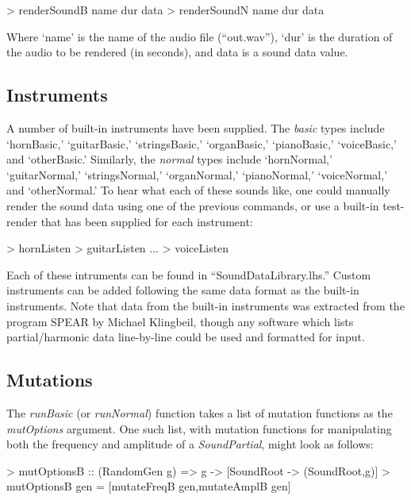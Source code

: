 \documentclass[11pt]{article}
\begin{document}
\begin{code}
> renderSoundB name dur data
> renderSoundN name dur data
\end{code}

Where `name' is the name of the audio file (``out.wav''), `dur' is the duration of the audio to be rendered (in seconds), and data is a sound data value.

\subsection{Instruments}

A number of built-in instruments have been supplied. The \emph{basic} types include `hornBasic,' `guitarBasic,' `stringsBasic,' `organBasic,' `pianoBasic,' `voiceBasic,' and `otherBasic.' Similarly, the \emph{normal} types include `hornNormal,' `guitarNormal,' `stringsNormal,' `organNormal,' `pianoNormal,' `voiceNormal,' and `otherNormal.' 
To hear what each of these sounds like, one could manually render the sound data using one of the previous commands, or use a built-in test-render that has been supplied for each instrument:

\begin{code}
> hornListen
> guitarListen
...
> voiceListen
\end{code}

Each of these intruments can be found in ``SoundDataLibrary.lhs.'' Custom instruments can be added following the same data format as the built-in instruments. Note that data from the built-in instruments was extracted from the program SPEAR by Michael Klingbeil\cite{klingbeil}, though any software which lists partial/harmonic data line-by-line could be used and formatted for input.

\subsection{Mutations}

The \emph{runBasic} (or \emph{runNormal}) function takes a list of mutation functions as the \emph{mutOptions} argument. One such list, with mutation functions for manipulating both the frequency and amplitude of a \emph{SoundPartial}, might look as follows:

\begin{code}
> mutOptionsB :: (RandomGen g) => g -> [SoundRoot -> (SoundRoot,g)]
> mutOptionsB gen = [mutateFreqB gen,mutateAmplB gen]
\end{code}
\end{document}
